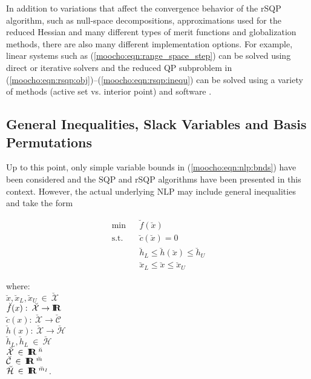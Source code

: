 \documentclass[pdf,ps2pdf,11pt]{SANDreport}
\begin{document}
{{In addition to variations that affect the convergence behavior of the
rSQP algorithm, such as null-space decompositions, approximations used
for the reduced Hessian and many different types of merit functions
and globalization methods, there are also many different
implementation options.  For example, linear systems such as
(\ref{moocho:eqn:range_space_step}) can be solved using direct or
iterative solvers and the reduced QP subproblem in
(\ref{moocho:eqn:rsqp:obj})--(\ref{moocho:eqn:rsqp:inequ}) can be
solved using a variety of methods (active set vs. interior point) and
software {}\cite{ref:schmid_qpkwik_1994}.

%
\subsection{General Inequalities, Slack Variables and Basis Permutations}
\label{moocho:sec:nlp_with_slacks}
%

Up to this point, only simple variable bounds in
(\ref{moocho:eqn:nlp:bnds}) have been considered and the SQP and rSQP
algorithms have been presented in this context.  However, the actual
underlying NLP may include general inequalities and take the form
%
{\bsinglespace
\begin{eqnarray}
\mbox{min}  &  & \breve{f}(\breve{x})                                     \label{moocho:eqn:nlporig:obj} \\
\mbox{s.t.} &  & \breve{c}(\breve{x}) = 0                                 \label{moocho:eqn:nlporig:equ} \\
            &  & \breve{h}_L \leq \breve{h}(\breve{x}) \leq \breve{h}_U   \label{moocho:eqn:nlporig:inequ} \\
            &  & \breve{x}_L \leq \breve{x}            \leq \breve{x}_U   \label{moocho:eqn:nlporig:bnds}
\end{eqnarray}
\begin{tabbing}
\hspace{4ex}where:\hspace{5ex}\= \\
\>	$\breve{x}, \breve{x}_L, \breve{x}_U \:\in\:\breve{\mathcal{X}}$ \\
\>	$\breve{f}(x) : \:\breve{\mathcal{X}} \rightarrow \mbox{\textbf{I}}\hspace{-0.6ex}\mbox{\textbf{R}}$ \\
\>	$\breve{c}(x) : \:\breve{\mathcal{X}} \rightarrow \breve{\mathcal{C}}$ \\
\>	$\breve{h}(x) : \:\breve{\mathcal{X}} \rightarrow \breve{\mathcal{H}}$ \\
\>	$\breve{h}_L, \breve{h}_L \:\in\:\breve{\mathcal{H}}$ \\
\>	$\breve{\mathcal{X}} \:\in\:\mbox{\textbf{I}}\hspace{-0.6ex}\mbox{\textbf{R}}\:^{\breve{n}}$ \\
\>	$\breve{\mathcal{C}} \:\in\:\mbox{\textbf{I}}\hspace{-0.6ex}\mbox{\textbf{R}}\:^{\breve{m}}$ \\
\>	$\breve{\mathcal{H}} \:\in\:\mbox{\textbf{I}}\hspace{-0.6ex}\mbox{\textbf{R}}\:^{\breve{m}_I}$.
\end{tabbing}
\esinglespace}

}}
\end{document}
